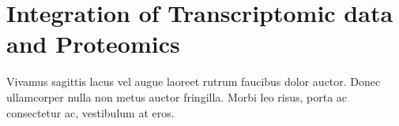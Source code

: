 \clearpage
\chapter{Integration of Transcriptomic data and Proteomics}

Vivamus sagittis lacus vel augue laoreet rutrum faucibus dolor auctor. Donec ullamcorper nulla non metus auctor fringilla. Morbi leo risus, porta ac consectetur ac, vestibulum at eros.


